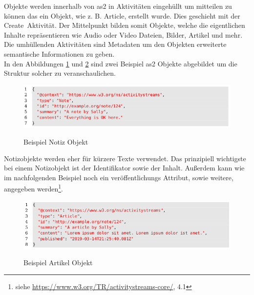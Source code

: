 {	Objekte werden innerhalb von \gls{as2} in Aktivitäten eingehüllt um mitteilen zu können das ein Objekt, wie z. B. \glqq Article\grqq, erstellt wurde. Dies geschieht mit der \glqq Create\grqq~Aktivität. Der Mittelpunkt bilden somit Objekte, welche die eigentlichen Inhalte repräsentieren wie Audio oder Video Dateien, Bilder, Artikel und mehr. Die umhüllenden Aktivitäten sind Metadaten um den Objekten erweiterte semantische Informationen zu geben.\\
	
	In den Abbildungen \ref{fig:object-note} und \ref{fig:object-article} sind zwei Beispiel \gls{as2} Objekte abgebildet um die Struktur solcher zu veranschaulichen.\\
	\begin{figure}[h]
		\begin{minipage}{\textwidth}
			\centering
			\includegraphics[scale=0.5]{figures/object-note.png}
			\label{fig:object-note}
			\caption{Beispiel Notiz Objekt}
		\end{minipage}
	\end{figure}

	Notizobjekte werden eher für kürzere Texte verwendet. Das prinzipiell wichtigste bei einem Notizobjekt ist der Identifikator sowie der Inhalt. Außerdem kann wie im nachfolgenden Beispiel noch ein veröffentlichungs Attribut, sowie weitere, angegeben werden\footnote{siehe \url{https://www.w3.org/TR/activitystreams-core/}, 4.1}.\\
	\begin{figure}[h]
		\begin{minipage}{\textwidth}
			\centering
			\includegraphics[scale=0.5]{figures/object-article.png}
			\label{fig:object-article}
			\caption{Beispiel Artikel Objekt}
		\end{minipage}
	\end{figure}

}
